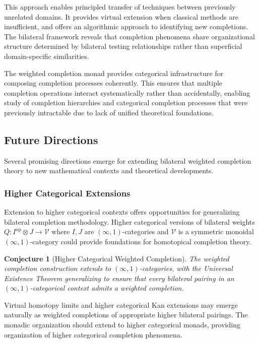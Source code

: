 \documentclass[11pt]{article}
\theoremstyle{plain}
\newtheorem{conjecture}[theorem]{Conjecture}
\theoremstyle{definition}
\theoremstyle{remark}
\newcommand{\V}{\mathcal{V}}
\newcommand{\op}{\mathrm{op}}
\begin{document}
This approach enables principled transfer of techniques between previously unrelated domains. It provides virtual extension when classical methods are insufficient, and offers an algorithmic approach to identifying new completions. The bilateral framework reveals that completion phenomena share organizational structure determined by bilateral testing relationships rather than superficial domain-specific similarities.

The weighted completion monad provides categorical infrastructure for composing completion processes coherently. This ensures that multiple completion operations interact systematically rather than accidentally, enabling study of completion hierarchies and categorical completion processes that were previously intractable due to lack of unified theoretical foundations.

\subsection{Future Directions}

Several promising directions emerge for extending bilateral weighted completion theory to new mathematical contexts and theoretical developments.

\subsubsection{Higher Categorical Extensions}

Extension to higher categorical contexts offers opportunities for generalizing bilateral completion methodology. Higher categorical versions of bilateral weights $Q : I^{\op} \otimes J \to \V$ where $I, J$ are $(\infty, 1)$-categories and $\V$ is a symmetric monoidal $(\infty, 1)$-category could provide foundations for homotopical completion theory.

\begin{conjecture}[Higher Categorical Weighted Completion]
The weighted completion construction extends to $(\infty, 1)$-categories, with the Universal Existence Theorem generalizing to ensure that every bilateral pairing in an $(\infty, 1)$-categorical context admits a weighted completion.
\end{conjecture}

Virtual homotopy limits and higher categorical Kan extensions may emerge naturally as weighted completions of appropriate higher bilateral pairings. The monadic organization should extend to higher categorical monads, providing organization of higher categorical completion phenomena.
\end{document}
